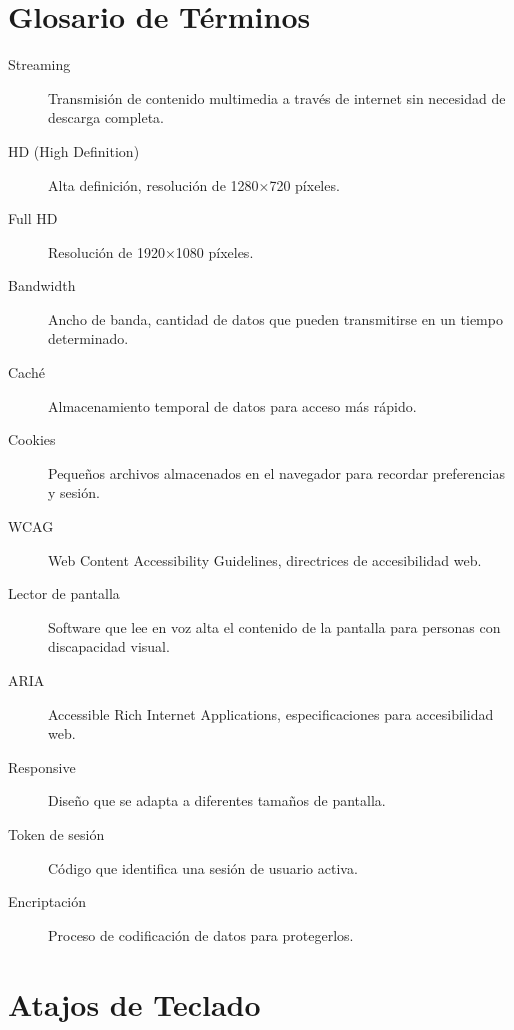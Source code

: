 \documentclass[11pt,a4paper,twoside]{book}
\begin{document}
\chapter{Glosario de Términos}

\begin{description}
    \item[Streaming] Transmisión de contenido multimedia a través de internet sin necesidad de descarga completa.
    \item[HD (High Definition)] Alta definición, resolución de 1280×720 píxeles.
    \item[Full HD] Resolución de 1920×1080 píxeles.
    \item[Bandwidth] Ancho de banda, cantidad de datos que pueden transmitirse en un tiempo determinado.
    \item[Caché] Almacenamiento temporal de datos para acceso más rápido.
    \item[Cookies] Pequeños archivos almacenados en el navegador para recordar preferencias y sesión.
    \item[WCAG] Web Content Accessibility Guidelines, directrices de accesibilidad web.
    \item[Lector de pantalla] Software que lee en voz alta el contenido de la pantalla para personas con discapacidad visual.
    \item[ARIA] Accessible Rich Internet Applications, especificaciones para accesibilidad web.
    \item[Responsive] Diseño que se adapta a diferentes tamaños de pantalla.
    \item[Token de sesión] Código que identifica una sesión de usuario activa.
    \item[Encriptación] Proceso de codificación de datos para protegerlos.
\end{description}

\chapter{Atajos de Teclado}
\end{document}
